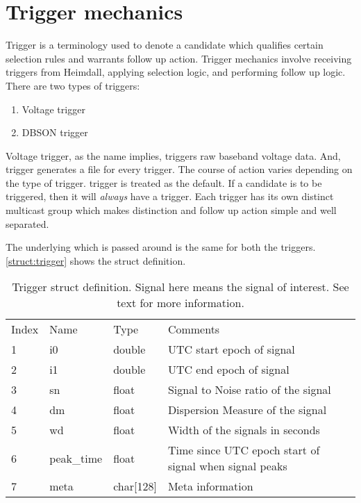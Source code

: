 \section {Trigger mechanics}
\label{sec:tmech}

\par Trigger is a terminology used to denote a candidate which qualifies certain selection rules and warrants follow up action. Trigger mechanics involve receiving triggers from Heimdall, applying selection logic, and performing follow up logic. 
There are two types of triggers: 
\begin{enumerate}
	\item Voltage trigger
	\item DBSON trigger
\end{enumerate}
Voltage trigger, as the name implies, triggers raw baseband voltage data. And, \dbson trigger generates a \dbson file for every trigger. The course of action varies depending on the type of trigger. 
\dbson trigger is treated as the default. If a candidate is to be triggered, then it will \emph{always} have a \dbson trigger.
Each trigger has its own distinct multicast group which makes distinction and follow up action simple and well separated.

\par The underlying \struct which is passed around is the same for both the triggers. \autoref{struct:trigger} shows the struct definition. 
\begin{table}
	\begin{tabular}{llll}
			Index & Name       & Type          & Comments                                               \\
			1     & i0         & double        & UTC start epoch of signal                              \\
			2     & i1         & double        & UTC end   epoch of signal                              \\
			3     & sn         & float         & Signal to Noise ratio of the signal                    \\
			4     & dm         & float         & Dispersion Measure of the signal                       \\
			5     & wd         & float         & Width of the signals in seconds                        \\
			6     & peak\_time & float         & Time since UTC epoch start of signal when signal peaks \\
			7     & meta       & char{[}128{]} & Meta information                                      
	\end{tabular}
	\caption {Trigger struct definition. Signal here means the signal of interest. See text for more information.}
	\label{struct:trigger}
\end{table}

